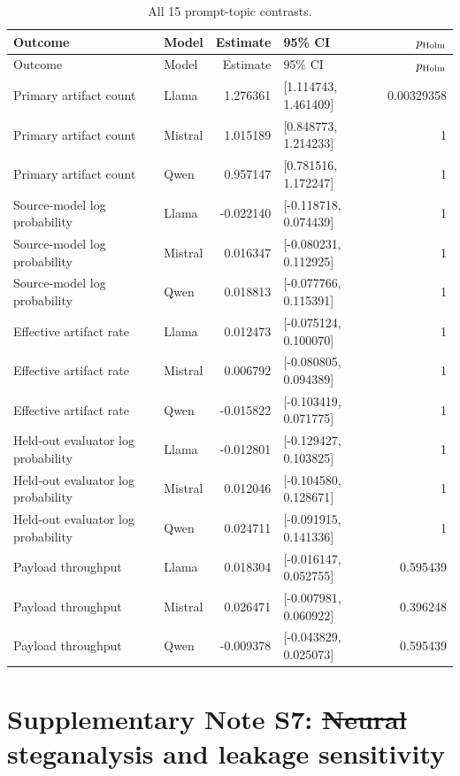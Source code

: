 \documentclass[fleqn,10pt]{wlscirep}
\providecommand{\DIFadd}[1]{{\protect\color{blue}\uwave{#1}}} %
\providecommand{\DIFdel}[1]{{\protect\color{red}\sout{#1}}}                      %
\providecommand{\DIFaddbegin}{} %
\providecommand{\DIFaddend}{} %
\providecommand{\DIFdelbegin}{} %
\providecommand{\DIFdelend}{} %
\newcommand{\DIFscaledelfig}{0.5}
\newlength{\DIFdelgraphicswidth} %
\newlength{\DIFdelgraphicsheight} %
\newcommand{\DIFaddincludegraphics}[2][]{{\color{blue}\fbox{\DIFOincludegraphics[#1]{#2}}}} %
\newcommand{\DIFdelincludegraphics}[2][]{%
\sbox{\DIFdelgraphicsbox}{\DIFOincludegraphics[#1]{#2}}%
\settoboxwidth{\DIFdelgraphicswidth}{\DIFdelgraphicsbox} %
\settoboxtotalheight{\DIFdelgraphicsheight}{\DIFdelgraphicsbox} %
\scalebox{\DIFscaledelfig}{%
\parbox[b]{\DIFdelgraphicswidth}{\usebox{\DIFdelgraphicsbox}\\[-\baselineskip] \rule{\DIFdelgraphicswidth}{0em}}\llap{\resizebox{\DIFdelgraphicswidth}{\DIFdelgraphicsheight}{%
\setlength{\unitlength}{\DIFdelgraphicswidth}%
\begin{picture}(1,1)%
\thicklines\linethickness{2pt} %
{\color[rgb]{1,0,0}\put(0,0){\framebox(1,1){}}}%
{\color[rgb]{1,0,0}\put(0,0){\line( 1,1){1}}}%
{\color[rgb]{1,0,0}\put(0,1){\line(1,-1){1}}}%
\end{picture}%
}\hspace*{3pt}}} %
} %
\DeclareRobustCommand{\DIFaddbegin}{\DIFOaddbegin \let\includegraphics\DIFaddincludegraphics} %
\DeclareRobustCommand{\DIFaddend}{\DIFOaddend \let\includegraphics\DIFOincludegraphics} %
\DeclareRobustCommand{\DIFdelbegin}{\DIFOdelbegin \let\includegraphics\DIFdelincludegraphics} %
\DeclareRobustCommand{\DIFdelend}{\DIFOaddend \let\includegraphics\DIFOincludegraphics} %
\begin{document}
\begin{longtable}{L{0.34\textwidth}L{0.13\textwidth}r L{0.22\textwidth}r}
\caption{\label{tab:all-topic}All 15 prompt-topic contrasts.}\\
\toprule
Outcome & Model & Estimate & 95\% CI & \(p_{\rm Holm}\) \\
\midrule
\endfirsthead
\toprule
Outcome & Model & Estimate & 95\% CI & \(p_{\rm Holm}\) \\
\midrule
\endhead
Primary artifact count & Llama & 1.276361 & [1.114743, 1.461409] & 0.00329358 \\
Primary artifact count & Mistral & 1.015189 & [0.848773, 1.214233] & 1 \\
Primary artifact count & Qwen & 0.957147 & [0.781516, 1.172247] & 1 \\
Source-model log probability & Llama & -0.022140 & [-0.118718, 0.074439] & 1 \\
Source-model log probability & Mistral & 0.016347 & [-0.080231, 0.112925] & 1 \\
Source-model log probability & Qwen & 0.018813 & [-0.077766, 0.115391] & 1 \\
Effective artifact rate & Llama & 0.012473 & [-0.075124, 0.100070] & 1 \\
Effective artifact rate & Mistral & 0.006792 & [-0.080805, 0.094389] & 1 \\
Effective artifact rate & Qwen & -0.015822 & [-0.103419, 0.071775] & 1 \\
Held-out evaluator log probability & Llama & -0.012801 & [-0.129427, 0.103825] & 1 \\
Held-out evaluator log probability & Mistral & 0.012046 & [-0.104580, 0.128671] & 1 \\
Held-out evaluator log probability & Qwen & 0.024711 & [-0.091915, 0.141336] & 1 \\
Payload throughput & Llama & 0.018304 & [-0.016147, 0.052755] & 0.595439 \\
Payload throughput & Mistral & 0.026471 & [-0.007981, 0.060922] & 0.396248 \\
Payload throughput & Qwen & -0.009378 & [-0.043829, 0.025073] & 0.595439 \\
\bottomrule
\end{longtable}

\section*{Supplementary Note S7: \DIFdelbegin \DIFdel{Neural }\DIFdelend \DIFaddbegin \DIFadd{Historical V2 neural }\DIFaddend steganalysis and leakage sensitivity}\label{si:s7}
\end{document}

